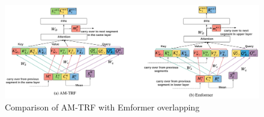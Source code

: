 \begin{figure}[!ht]
	\centering
	\includegraphics[width=1 \textwidth]{images/AM-TR-Emformer.png}\\
	\caption{Comparison of AM-TRF with Emformer overlapping}
    \caption*{\cite{shi2021emformer}}
	\label{fig:AM-TR-Emformer}
\end{figure}






